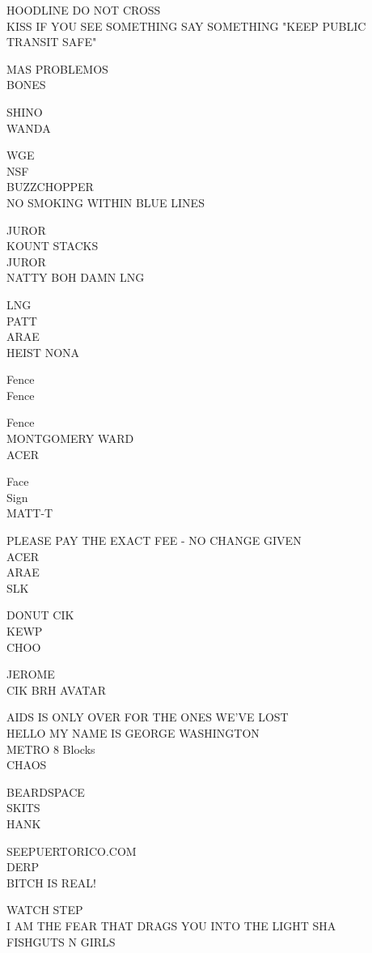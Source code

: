 \documentclass[10pt,letterpaper]{article}
\begin{document}
HOODLINE DO NOT CROSS\\
KISS IF YOU SEE SOMETHING SAY SOMETHING "KEEP PUBLIC TRANSIT SAFE"

MAS PROBLEMOS\\
BONES

SHINO\\
WANDA

WGE\\
NSF\\
BUZZCHOPPER\\
NO SMOKING WITHIN BLUE LINES

JUROR\\
KOUNT STACKS\\
JUROR\\
NATTY BOH DAMN LNG

LNG\\
PATT\\
ARAE\\
HEIST NONA

Fence\\
Fence

Fence\\
MONTGOMERY WARD\\
ACER

Face\\
Sign\\
MATT{-}T

PLEASE PAY THE EXACT FEE {-} NO CHANGE GIVEN\\
ACER\\
ARAE\\
SLK

DONUT CIK\\
KEWP\\
CHOO

JEROME\\
CIK BRH AVATAR

AIDS IS ONLY OVER FOR THE ONES WE'VE LOST\\
HELLO MY NAME IS GEORGE WASHINGTON\\
METRO 8 Blocks\\
CHAOS

BEARDSPACE\\
SKITS\\
HANK

SEEPUERTORICO.COM\\
DERP\\
BITCH IS REAL!

WATCH STEP\\
I AM THE FEAR THAT DRAGS YOU INTO THE LIGHT SHA\\
FISHGUTS N GIRLS
\pagebreak
\end{document}
